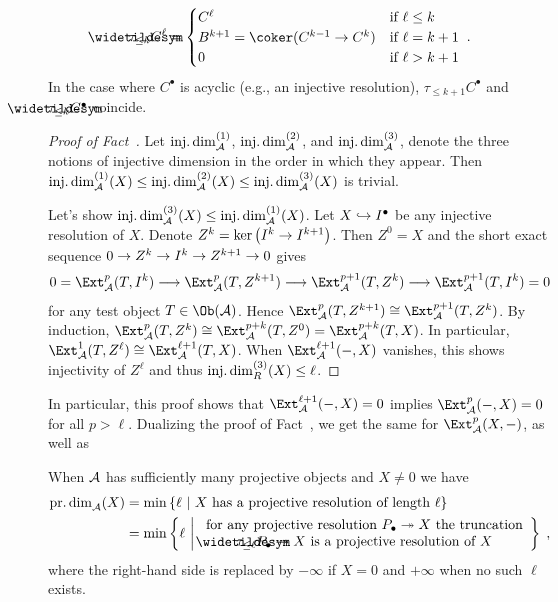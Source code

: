 \documentclass[a4paper,parskip=half,numbers=enddot, DIV=12]{scrreprt}
\begin{document}
\begin{align*}
\snake{\tau}_{\leq k}C^\ell=\begin{cases}
C^\ell & \text{if }\ell\leq k\\
B^{k+1}=\coker(C^{k-1}\morphism C^k) & \text{if }\ell=k+1\\
0 & \text{if }\ell>k+1
\end{cases}\;.
\end{align*}
In the case where $C^\bullet$ is acyclic (e.g., an injective resolution), $\tau_{\leq k+1}C^\bullet$ and $\snake{\tau}_{\leq k}C^\bullet$ coincide.
\begin{proof}[Proof of Fact~]
	Let $\operatorname{inj.dim}_{\mathcal{A}}^{(1)}$, $\operatorname{inj.dim}_{\mathcal{A}}^{(2)}$, and $\operatorname{inj.dim}_{\mathcal{A}}^{(3)}$,  denote the three notions of injective dimension in the order in which they appear. Then $\operatorname{inj.dim}_{\mathcal{A}}^{(1)}(X)\leq \operatorname{inj.dim}_{\mathcal{A}}^{(2)}(X)\leq \operatorname{inj.dim}_{\mathcal{A}}^{(3)}(X)$ is trivial.
	
	Let's show $\operatorname{inj.dim}_{\mathcal{A}}^{(3)}(X)\leq \operatorname{inj.dim}_{\mathcal{A}}^{(1)}(X)$. Let $X\monomorphism I^\bullet$ be any injective resolution of $X$. Denote $Z^k=\ker\left(I^k\morphism I^{k+1}\right)$. Then $Z^0=X$ and the short exact sequence $0\morphism Z^k\morphism I^k\morphism Z^{k+1}\morphism 0$ gives
	\begin{align*}
		0=\Ext_\Aa^p(T,I^k)\morphism \Ext_\Aa^p(T,Z^{k+1})\morphism\Ext_\Aa^{p+1}(T,Z^k)\morphism\Ext_\Aa^{p+1}(T,I^k)=0
	\end{align*}
	for any test object $T\in\Ob(\Aa)$. Hence $\Ext_\Aa^p(T,Z^{k+1})\cong \Ext_\Aa^{p+1}(T,Z^k)$. By induction, $\Ext_\Aa^p(T,Z^k)\cong \Ext_\Aa^{p+k}(T,Z^0)=\Ext_\Aa^{p+k}(T,X)$. In particular, $\Ext_\Aa^1(T,Z^\ell)\cong \Ext_\Aa^{\ell+1}(T,X)$. When $\Ext_\Aa^{\ell+1}(-,X)$ vanishes, this shows injectivity of $Z^\ell$ and thus $\operatorname{inj.dim}_R^{(3)}(X)\leq \ell$.
\end{proof}
In particular, this proof shows that $\Ext_\Aa^{\ell+1}(-,X)=0$ implies $\Ext_\Aa^p(-,X)=0$ for all $p>\ell$. Dualizing the proof of Fact~, we get the same for $\Ext_\Aa^p(X,-)$, as well as 
\begin{fact}
	When $\mathcal{A}$ has sufficiently many projective objects and $X\neq 0$ we have
	\begin{align*}
	\pdim_\Aa(X)&=\min\left\{\ell\st X\text{ has a projective resolution of length }\ell\right\}\\
	&=	\min\left\{\ell\st\begin{array}{c}
	\text{for any projective resolution }P_\bullet\epimorphism X\text{ the truncation}\\
	\snake{\tau}_{\leq\ell}P_\bullet\epimorphism X\text{ is a projective resolution of }X
	\end{array}
	\right\}\;,
	\end{align*}
	where the right-hand side is replaced by $-\infty$ if $X=0$ and $+\infty$ when no such $\ell$ exists.
\end{fact}
\end{document}
